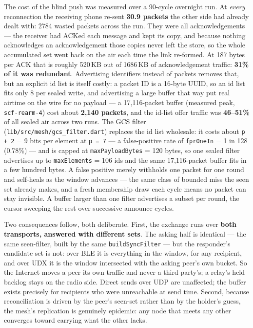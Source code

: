 \documentclass[11pt]{report}
\newcommand{\code}[1]{\texttt{\small #1}}
\begin{document}
The cost of the blind push was measured over a 90-cycle overnight run. At \emph{every} reconnection the receiving phone re-sent \textbf{30.9 packets} the other side had already dealt with: 2784 wasted packets across the run. They were all acknowledgements --- the receiver had ACKed each message and kept its copy, and because nothing acknowledges an acknowledgement those copies never left the store, so the whole accumulated set went back on the air each time the link re-formed. At 187 bytes per ACK that is roughly 520\,KB out of 1686\,KB of acknowledgement traffic: \textbf{31\% of it was redundant}. Advertising identifiers instead of packets removes that, but an explicit id list is itself costly: a packet ID is a 16-byte UUID, so an id list fits only 8 per sealed write, and advertising a large buffer that way put real airtime on the wire for no payload --- a 17{,}116-packet buffer (measured peak, \code{scf-rearm-4}) cost about \textbf{2{,}140 packets}, and the id-list offer traffic was \textbf{46--51\%} of all sealed air across two runs. The GCS filter (\code{lib/src/mesh/gcs\_filter.dart}) replaces the id list wholesale: it costs about \code{p + 2} = 9 bits per element at \code{p = 7} --- a false-positive rate of \code{fprOneIn} = 1 in 128 (0.78\%) --- and is capped at \code{maxPayloadBytes} = 120 bytes, so one sealed filter advertises up to \code{maxElements} = 106 ids and the same 17{,}116-packet buffer fits in a few hundred bytes. A false positive merely withholds one packet for one round and self-heals as the window advances --- the same class of bounded miss the seen set already makes, and a fresh membership draw each cycle means no packet can stay invisible. A buffer larger than one filter advertises a subset per round, the cursor sweeping the rest over successive announce cycles.

Two consequences follow, both deliberate. First, the exchange runs over \textbf{both transports, answered with different sets}. The asking half is identical --- the same seen-filter, built by the same \code{buildSyncFilter} --- but the responder's candidate set is not: over BLE it is everything in the window, for any recipient, and over UDX it is the window intersected with the asking peer's own bucket. So the Internet moves a peer its own traffic and never a third party's; a relay's held backlog stays on the radio side. Direct sends over UDP are unaffected; the buffer exists precisely for recipients who were unreachable at send time. Second, because reconciliation is driven by the peer's seen-set rather than by the holder's guess, the mesh's replication is genuinely epidemic: any node that meets any other converges toward carrying what the other lacks.
\end{document}
